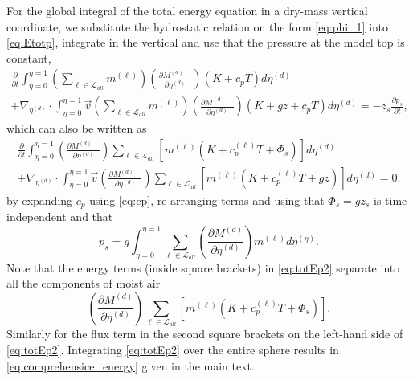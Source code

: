 \documentclass{agujournal}
\begin{document}
{For the global integral of the total energy equation in a dry-mass vertical coordinate, we substitute the hydrostatic relation on the form \eqref{eq:phi_1} into \eqref{eq:Etotp}, integrate in the vertical and use that the pressure at the model top is constant,
\begin{multline}
\frac{\partial }{\partial t}\int_{\eta=0}^{\eta=1} \left( \sum_{\ell \in \mathcal{L}_{all}} m^{(\ell)}\right) \left( \frac{\partial M^{(d)}\quad }{\partial \eta^{(d)}} \right)\left(K+c_pT\right)d \eta^{(d)}\\ +\nabla_{\eta^{(d)}} \cdot \int_{\eta=0}^{\eta=1} \vec{v} \left( \sum_{\ell \in \mathcal{L}_{all}} m^{(\ell)}\right) \left( \frac{\partial M^{(d)}\quad }{\partial \eta^{(d)}} \right)\left( K+gz+c_pT \right) d \eta^{(d)} =-z_s\frac{\partial p_s}{\partial t},\label{eq:tmp99}
\end{multline}
which can also be written as
\begin{multline}
\frac{\partial }{\partial t}\int_{\eta=0}^{\eta=1} \left( \frac{\partial M^{(d)}\quad }{\partial \eta^{(d)}} \right)\sum_{\ell \in \mathcal{L}_{all}} \left[m^{(\ell)} \left(K+c_p^{(\ell)}T+\Phi_s  \right)\right]d \eta^{(d)}\\ +\nabla_{\eta^{(d)}} \cdot \int_{\eta=0}^{\eta=1} \vec{v} \left( \frac{\partial M^{(d)}\quad }{\partial \eta^{(d)}} \right)\sum_{\ell \in \mathcal{L}_{all}} \left[ m^{(\ell)}\left(K+c_p^{(\ell)}T+gz\right) \right]d \eta^{(d)} =0.\label{eq:totEp2}
\end{multline}
by expanding $c_p$ using \eqref{eq:cp}, re-arranging terms and using that $\Phi_s=gz_s$ is time-independent and that 
\begin{equation}
p_s=g\int_{\eta=0}^{\eta=1}\sum_{\ell \in \mathcal{L}_{all}}  \left( \frac{\partial M^{(d)}}{\partial \eta^{(d)}}\right) m^{(\ell)}d\eta^{(\eta)}.
\end{equation}
Note that the energy terms (inside square brackets) in \eqref{eq:totEp2} separate into all the components of moist air
\begin{equation}
\left( \frac{\partial M^{(d)}}{\partial \eta^{(d)}} \right)\sum_{\ell \in \mathcal{L}_{all}} \left[ m^{(\ell)}\left(K+c_p^{(\ell)}T+\Phi_s\right)\right].
\end{equation}
Similarly for the flux term in the second square brackets on the left-hand side of \eqref{eq:totEp2}. Integrating \eqref{eq:totEp2} over the entire sphere results in \eqref{eq:comprehensice_energy} given in the main text.


}
\end{document}
